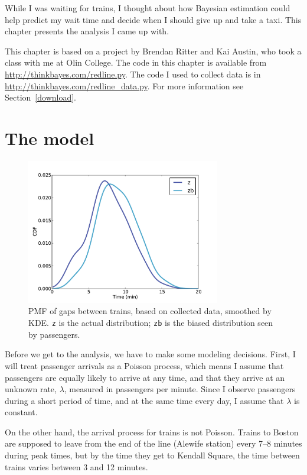 \documentclass[12pt]{book}
\theoremstyle{exercise}
\begin{document}
While I was waiting for trains, I thought about how Bayesian
estimation could help predict my wait time and decide when I
should give up and take a taxi.  This chapter presents the
analysis I came up with.

This chapter is based on a project by Brendan Ritter and
Kai Austin, who took a class with me at Olin College.
The code in this chapter is available from
\url{http://thinkbayes.com/redline.py}.  The code I used
to collect data is in \url{http://thinkbayes.com/redline_data.py}.
  For more information
see Section~\ref{download}.


\section{The model}

\begin{figure}
\centerline{\includegraphics[height=2.5in]{figs/redline0.pdf}}
\caption{PMF of gaps between trains, based on collected data,
smoothed by KDE.  {\tt z} is the actual distribution; {\tt zb}
is the biased distribution seen by passengers. }
\label{fig.redline0}
\end{figure}

Before we get to the analysis, we have to make some
modeling decisions.  First, I will treat passenger arrivals as
a Poisson process, which means I assume that passengers are equally
likely to arrive at any time, and that they arrive at an unknown
rate, $\lambda$, measured in passengers per minute.  Since I
observe passengers during a short period of time, and at the same
time every day, I assume that $\lambda$ is constant.

On the other hand, the arrival process for trains is not Poisson.
Trains to Boston are supposed to leave from the end of the line
(Alewife station) every 7--8 minutes during peak times, but by the time
they get to Kendall Square, the time between trains varies between 3
and 12 minutes.
\end{document}

